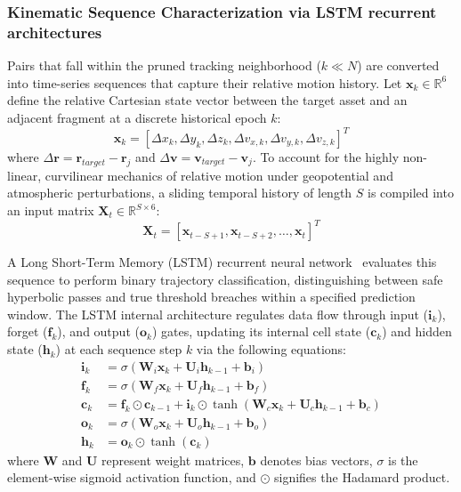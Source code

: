 \documentclass[letterpaper,11pt]{AAS}
\begin{document}
\subsubsection{Kinematic Sequence Characterization via LSTM recurrent architectures}
Pairs that fall within the pruned tracking neighborhood ($k \ll N$) are converted into time-series sequences that capture their relative motion history. Let $\mathbf{x}_k \in \mathbb{R}^6$ define the relative Cartesian state vector between the target asset and an adjacent fragment at a discrete historical epoch $k$:
\begin{equation}
    \mathbf{x}_k = \left[ \Delta x_k, \Delta y_k, \Delta z_k, \Delta v_{x,k}, \Delta v_{y,k}, \Delta v_{z,k} \right]^T
    \label{eq:relative_state_vector}
\end{equation}
where $\Delta \mathbf{r} = \mathbf{r}_{target} - \mathbf{r}_j$ and $\Delta \mathbf{v} = \mathbf{v}_{target} - \mathbf{v}_j$. To account for the highly non-linear, curvilinear mechanics of relative motion under geopotential and atmospheric perturbations, a sliding temporal history of length $S$ is compiled into an input matrix $\mathbf{X}_t \in \mathbb{R}^{S \times 6}$:
\begin{equation}
    \mathbf{X}_t = \left[ \mathbf{x}_{t-S+1}, \mathbf{x}_{t-S+2}, \dots, \mathbf{x}_t \right]^T
    \label{eq:sequence_matrix}
\end{equation}

A Long Short-Term Memory (LSTM) recurrent neural network~\cite{hochreiter_long_1997} evaluates this sequence to perform binary trajectory classification, distinguishing between safe hyperbolic passes and true threshold breaches within a specified prediction window. The LSTM internal architecture regulates data flow through input ($\mathbf{i}_k$), forget ($\mathbf{f}_k$), and output ($\mathbf{o}_k$) gates, updating its internal cell state ($\mathbf{c}_k$) and hidden state ($\mathbf{h}_k$) at each sequence step $k$ via the following equations:
\begin{align}
    \mathbf{i}_k &= \sigma\left( \mathbf{W}_i \mathbf{x}_k + \mathbf{U}_i \mathbf{h}_{k-1} + \mathbf{b}_i \right) \\
    \mathbf{f}_k &= \sigma\left( \mathbf{W}_f \mathbf{x}_k + \mathbf{U}_f \mathbf{h}_{k-1} + \mathbf{b}_f \right) \\
    \mathbf{c}_k &= \mathbf{f}_k \odot \mathbf{c}_{k-1} + \mathbf{i}_k \odot \tanh\left( \mathbf{W}_c \mathbf{x}_k + \mathbf{U}_c \mathbf{h}_{k-1} + \mathbf{b}_c \right) \\
    \mathbf{o}_k &= \sigma\left( \mathbf{W}_o \mathbf{x}_k + \mathbf{U}_o \mathbf{h}_{k-1} + \mathbf{b}_o \right) \\
    \mathbf{h}_k &= \mathbf{o}_k \odot \tanh\left( \mathbf{c}_k \right)
\end{align}
where $\mathbf{W}$ and $\mathbf{U}$ represent weight matrices, $\mathbf{b}$ denotes bias vectors, $\sigma$ is the element-wise sigmoid activation function, and $\odot$ signifies the Hadamard product.
\end{document}

